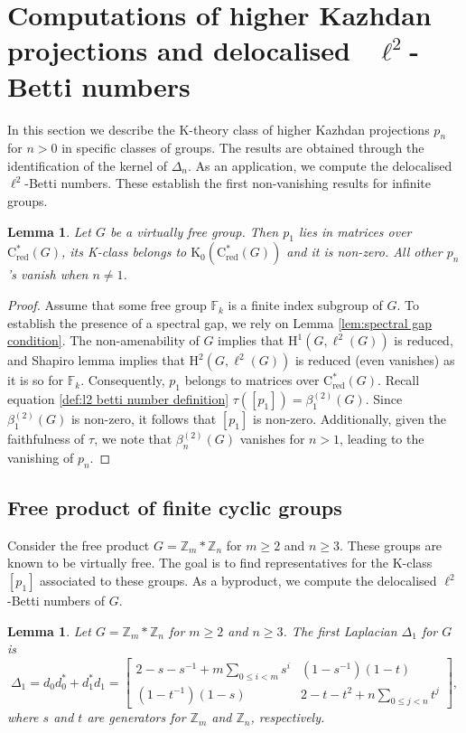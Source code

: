 \documentclass[a4paper,leqno,12pt]{article}
\numberwithin{equation}{section}
\theoremstyle{plain}
\newtheorem{lemma}[theoremcounter]{Lemma}
\theoremstyle{definition}
\theoremstyle{remark}
\newcommand{\Csr}{\mathrm{C}^*_{\text{red}}}
\begin{document}
	\section{Computations of higher Kazhdan projections and \mbox{delocalised}~ \texorpdfstring {$\ell^2$-} -Betti numbers}
	\label{sec: computations}
	
	In this section we describe the K-theory class of higher Kazhdan projections $p_n$ for $n>0$ in specific classes of groups. The results are obtained through the identification of the kernel of $\Delta_n$. As an application, we compute the delocalised $\ell^2$-Betti numbers. These establish the first non-vanishing results for infinite groups.
	
	\begin{lemma} \label{lem:existence}
		Let $G$ be a virtually free group. Then $p_1$ lies in matrices over $\Csr(G)$, its K-class belongs to
		$\mathrm{K_0}(\Csr(G))$ and it is non-zero. All other $p_n$'s vanish when $n\neq 1$.
	\end{lemma}
	
	\begin{proof}
		Assume that some free group $\mathbb F_k$ is a finite index subgroup of $G$. To establish the presence of a spectral gap, we rely on Lemma \ref{lem:spectral gap condition}. The non-amenability of $G$ implies that $\mathrm H^1(G, \ell^2 (G))$ is reduced, and  
		Shapiro lemma implies that $\mathrm H^2(G, \ell^2(G))$ is reduced (even vanishes) as it is so for $\mathbb F_k$. Consequently, $p_1$ belongs to matrices over $\Csr(G)$. 
		Recall equation \ref{def:l2 betti number definition}
		$\tau([p_1]) = \beta^{(2)}_{1}(G)$. Since $\beta^{(2)}_{1}(G)$ is non-zero, it follows that $[p_1]$ is non-zero. Additionally, given the faithfulness of $\tau$, we note that $\beta^{(2)}_{n}(G)$ vanishes for $n> 1$, leading to the vanishing of $p_n$.
	\end{proof}
	
	\subsection{Free product of finite cyclic groups}
	Consider the free product $G= \mathbb Z_m * \mathbb Z_n$ for $m \geq 2$ and $n \geq 3$. These groups are known to be virtually free. The goal is to find representatives for the K-class $[p_1]$ associated to these groups. As a byproduct, we compute the delocalised $\ell^2$-Betti numbers of $G$.
	
	\begin{lemma}
		\label{lem:Delta1}
		Let $G= \mathbb Z_m * \mathbb Z_n$ for $m \geq 2$ and $n \geq 3$. The first Laplacian $\Delta_1$ for $G$ is
		\[
		\Delta_1=d_0d_0^*+d_1^*d_1=
		\begin{bmatrix}2-s-s^{-1}+m\sum_{0 \leq i < m}s^i & (1-s^{-1})(1-t)\\
			(1-t^{-1})(1-s) & 2-t-t^2+n\sum_{0 \leq j < n}t^j
		\end{bmatrix},
		\]
		where $s$ and $t$ are generators for $\mathbb Z_m$ and $\mathbb Z_n$, respectively. 
	\end{lemma}
	
\end{document}
